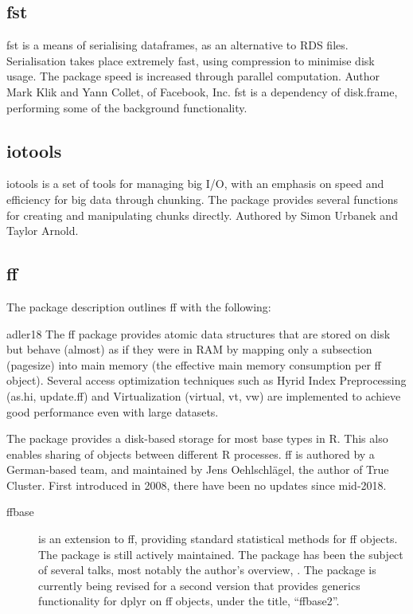\documentclass[a4paper,10pt]{article}
\begin{document}
\subsection{fst}
\label{sec:fst}

fst is a means of serialising dataframes, as an alternative to RDS
files\cite{klik19}. Serialisation takes place extremely fast, using compression to
minimise disk usage. The package speed is increased through parallel
computation. Author Mark Klik and Yann Collet, of Facebook, Inc. fst
is a dependency of disk.frame, performing some of the background
functionality.

\subsection{iotools}
\label{sec:iotools}

iotools is a set of tools for managing big I/O, with an emphasis on
speed and efficiency for big data through chunking\cite{urbanek20b}.
The package provides several functions for creating and manipulating
chunks directly. Authored by Simon Urbanek and Taylor Arnold.

\subsection{ff}
\label{sec:ff}

The package description outlines ff with the following:

\begin{displaycquote}{adler18}
	The ff package provides atomic data structures that are stored on
	disk but behave (almost) as if they were in RAM by mapping only a
	subsection (pagesize) into main memory (the effective main memory
	consumption per ff object). Several access optimization techniques
	such as Hyrid Index Preprocessing (as.hi, update.ff) and
	Virtualization (virtual, vt, vw) are implemented to achieve good
	performance even with large datasets.
\end{displaycquote}

The package provides a disk-based storage for most base types in R.
This also enables sharing of objects between different R processes. ff
is authored by a German-based team, and maintained by Jens
Oehlschlägel, the author of True Cluster. First introduced in
2008\cite{adler08:_large_r}, there have been no updates since
mid-2018.

\begin{description}
	\item[ffbase\cite{jonge20}] is an extension to ff, providing standard
	      statistical methods for ff objects. The package is still actively
	      maintained. The package has been the subject of several talks, most
	      notably the author's overview, \textcite{wijffels13}. The package is
	      currently being revised for a second version that provides generics
	      functionality for dplyr on ff objects, under the title,
	      ``ffbase2''\cite{jonge15}.
\end{description}
\end{document}
